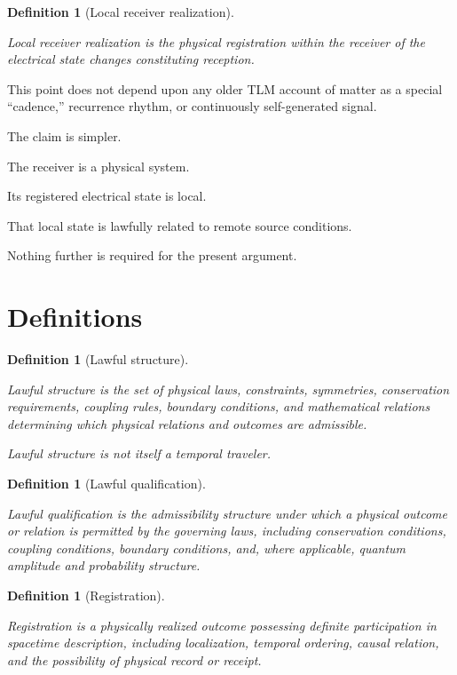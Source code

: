 \documentclass[12pt,onecolumn]{article}
\newtheorem{definition}[proposition]{Definition}
\begin{document}
\begin{definition}[Local receiver realization]
\label{def:localrealization}

Local receiver realization is the physical registration within the
receiver of the electrical state changes constituting reception.

\end{definition}

This point does not depend upon any older TLM account of matter as a
special ``cadence,'' recurrence rhythm, or continuously self-generated
signal.

The claim is simpler.

The receiver is a physical system.

Its registered electrical state is local.

That local state is lawfully related to remote source conditions.

Nothing further is required for the present argument.

\section{Definitions}
\label{sec:definitions}

\begin{definition}[Lawful structure]
\label{def:lawfulstructure}

Lawful structure is the set of physical laws, constraints, symmetries,
conservation requirements, coupling rules, boundary conditions, and
mathematical relations determining which physical relations and outcomes
are admissible.

Lawful structure is not itself a temporal traveler.

\end{definition}

\begin{definition}[Lawful qualification]
\label{def:qualification}

Lawful qualification is the admissibility structure under which a
physical outcome or relation is permitted by the governing laws,
including conservation conditions, coupling conditions, boundary
conditions, and, where applicable, quantum amplitude and probability
structure.

\end{definition}

\begin{definition}[Registration]
\label{def:registration}

Registration is a physically realized outcome possessing definite
participation in spacetime description, including localization, temporal
ordering, causal relation, and the possibility of physical record or
receipt.

\end{definition}
\end{document}
